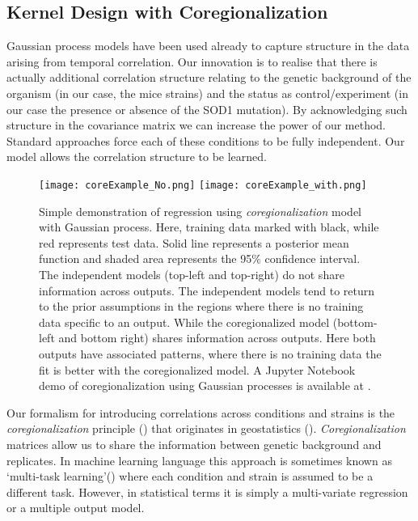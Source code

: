 \subsection{Kernel Design with Coregionalization}\label{subSec:Kernel_Design_with_Coregionalization}
Gaussian process models have been used already to capture structure in the data arising from temporal correlation. Our innovation is to realise that there is actually additional correlation structure relating to the genetic background of the organism (in our case, the mice strains) and the status as control/experiment (in our case the presence or absence of the SOD1 mutation). By acknowledging such structure in the covariance matrix we can increase the power of our method. Standard approaches force each of these conditions to be fully independent. Our model allows the correlation structure to be learned.
\begin{figure}
 \begin{center}
  \texttt{[image: coreExample\_No.png]}
  \texttt{[image: coreExample\_with.png]}
    \caption [Simple demonstration of  \emph{coregionalization} model] 
    {Simple demonstration of regression using \emph{coregionalization} model with Gaussian process. Here, training data marked with black, while red represents test data. Solid line represents a posterior mean function and shaded area represents the 95\% confidence interval. The independent models (top-left and top-right) do not share information across outputs. The independent models tend to return to the prior assumptions in the regions where there is no training data specific to an output. While the coregionalized model (bottom-left and bottom right) shares information across outputs. Here both outputs have associated patterns, where there is no training data the fit is better with the coregionalized model. A Jupyter Notebook demo of coregionalization using Gaussian processes is available at \cite{gpy2014}.
  \label{fig:demoCoregionalization}}
 \end{center}
\end{figure}

Our formalism for introducing correlations across conditions and strains is the \emph{coregionalization} principle (\cite{Alvarez:2011}) that originates in geostatistics (\cite{Wackernagel:2003}). \emph{Coregionalization} matrices allow us to share the information between genetic background and replicates. In machine learning language this approach is sometimes known as \lq multi-task learning\rq (\cite{Bonilla:2007}) where each condition and strain is assumed to be a different task. However, in statistical terms it is simply a multi-variate regression or a multiple output model.

